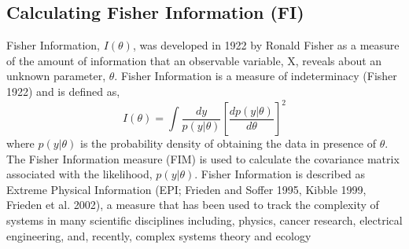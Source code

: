 \documentclass[12pt,twoside,openany]{reedthesis}
\begin{document}
\subsection{Calculating Fisher Information
(FI)}\label{calculating-fisher-information-fi}

Fisher Information, \(I(\theta)\), was developed in 1922 by Ronald
Fisher as a measure of the amount of information that an observable
variable, X, reveals about an unknown parameter, \(\theta\). Fisher
Information is a measure of indeterminacy (Fisher 1922) and is defined
as,
\begin{equation} 
  I(\theta) = \int \frac{dy}{p(y|\theta)}\left[\frac{dp(y|\theta)}{d\theta}\right]^2
  \label{eq:fiGeneral1922}
\end{equation}
where \(p(y|\theta)\) is the probability density of obtaining the data
in presence of \(\theta\). The Fisher Information measure (FIM) is used
to calculate the covariance matrix associated with the likelihood,
\(p(y|\theta)\). Fisher Information is described as Extreme Physical
Information (EPI; Frieden and Soffer 1995, Kibble 1999, Frieden et al.
2002), a measure that has been used to track the complexity of systems
in many scientific disciplines including, physics, cancer research,
electrical engineering, and, recently, complex systems theory and
ecology
\end{document}
